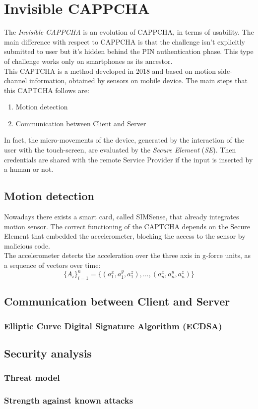 \chapter{Invisible CAPPCHA}\label{chapter:InvisibleCAPPCHA}
The \textit{Invisible CAPPCHA} is an evolution of CAPPCHA, in terms of usability\cite{Invisible_CAPPCHA}. The main difference with respect to CAPPCHA is that the challenge isn't explicitly submitted to user but it's hidden behind the PIN authentication phase. This type of challenge works only on smartphones as its ancestor.\\
This CAPTCHA is a method developed in 2018 and based on motion side-channel information, obtained by sensors on mobile device. The main steps that this CAPTCHA follows are:
\begin{enumerate}
\item{Motion detection}
\item{Communication between Client and Server}
\end{enumerate}
In fact, the micro-movements of the device, generated by the interaction of the user with the touch-screen, are evaluated by the \textit{Secure Element} (\textit{SE}). Then credentials are shared with the remote Service Provider if the input is inserted by a human or not.\\

\section{Motion detection}
Nowadays there exists a smart card, called SIMSense, that already integrates motion sensor. The correct functioning of the CAPTCHA depends on the Secure Element that embedded the accelerometer, blocking the access to the sensor by malicious code.\\
The accelerometer detects the acceleration over the three axis in g-force units, as a sequence of vectors over time:
$$\{ A_i\}_{i=1}^{n} = \{ (a_1^x, a_1^y, a_1^z), ..., (a_n^x, a_n^y, a_n^z)\}$$



\section{Communication between Client and Server}


\subsection{Elliptic Curve Digital Signature Algorithm (ECDSA)}


\section{Security analysis}


\subsection{Threat model}


\subsection{Strength against known attacks}